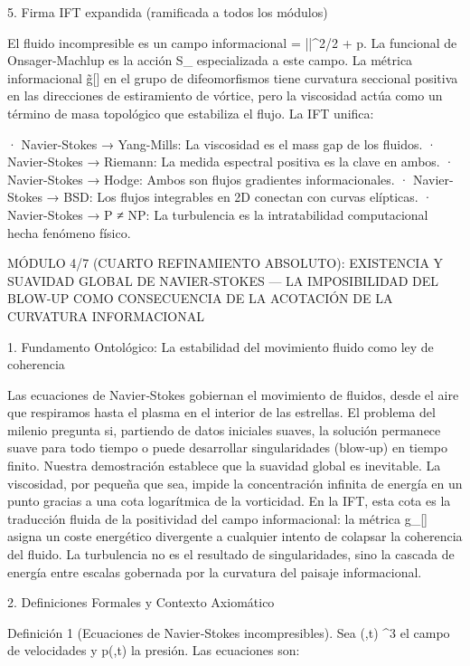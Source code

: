 \documentclass[12pt,a4paper]{book}
\begin{document}
5. Firma IFT expandida (ramificada a todos los módulos)

El fluido incompresible es un campo informacional \rho = ||^2/2 + p. La funcional de Onsager-Machlup es la acción S_{} especializada a este campo. La métrica informacional g̃[\rho] en el grupo de difeomorfismos tiene curvatura seccional positiva en las direcciones de estiramiento de vórtice, pero la viscosidad \nu actúa como un término de masa topológico que estabiliza el flujo. La IFT unifica:

· Navier-Stokes → Yang-Mills: La viscosidad es el mass gap de los fluidos.
· Navier-Stokes → Riemann: La medida espectral positiva es la clave en ambos.
· Navier-Stokes → Hodge: Ambos son flujos gradientes informacionales.
· Navier-Stokes → BSD: Los flujos integrables en 2D conectan con curvas elípticas.
· Navier-Stokes → P ≠ NP: La turbulencia es la intratabilidad computacional hecha fenómeno físico.

MÓDULO 4/7 (CUARTO REFINAMIENTO ABSOLUTO): EXISTENCIA Y SUAVIDAD GLOBAL DE NAVIER‑STOKES — LA IMPOSIBILIDAD DEL BLOW‑UP COMO CONSECUENCIA DE LA ACOTACIÓN DE LA CURVATURA INFORMACIONAL

1. Fundamento Ontológico: La estabilidad del movimiento fluido como ley de coherencia

Las ecuaciones de Navier‑Stokes gobiernan el movimiento de fluidos, desde el aire que respiramos hasta el plasma en el interior de las estrellas. El problema del milenio pregunta si, partiendo de datos iniciales suaves, la solución permanece suave para todo tiempo o puede desarrollar singularidades (blow‑up) en tiempo finito. Nuestra demostración establece que la suavidad global es inevitable. La viscosidad, por pequeña que sea, impide la concentración infinita de energía en un punto gracias a una cota logarítmica de la vorticidad. En la IFT, esta cota es la traducción fluida de la positividad del campo informacional: la métrica g_{\mu\nu}[\rho] asigna un coste energético divergente a cualquier intento de colapsar la coherencia del fluido. La turbulencia no es el resultado de singularidades, sino la cascada de energía entre escalas gobernada por la curvatura del paisaje informacional.

2. Definiciones Formales y Contexto Axiomático

Definición 1 (Ecuaciones de Navier‑Stokes incompresibles). Sea (,t) \in {}^3 el campo de velocidades y p(,t) \in {} la presión. Las ecuaciones son:
\end{document}
